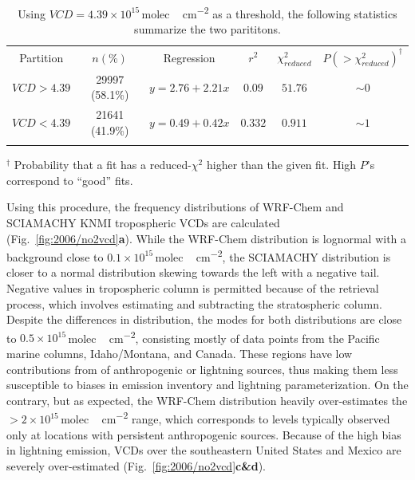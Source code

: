 	\begin{table}
		\begin{center}
		\begin{singlespacing}
		\caption[Linear regression on $NO_2$ VCDs]{Using $VCD=4.39\times10^{15}$\,\unit{molec.\,cm^{-2}} as a threshold, the following statistics summarize the two parititons.}
		\begin{tabular}{cccccc} \tophline
		Partition&  $n(\%)$ & Regression & $r^2$ & $\chi_{reduced}^2$ & $P(>\chi_{reduced}^2)^\dagger$ \\
		\middlehline
		$VCD>4.39$ & 29997 (58.1\%) & $y=2.76+2.21x$ & $0.09$ & $51.76$ & $\sim0$ \\
		$VCD<4.39$ & 21641 (41.9\%)  & $y=0.49+0.42x$ & $0.332$ & $0.911$ & $\sim1$ \\
		\bottomhline
		\end{tabular}
		\label{tab:2006/no2reg}
		\end{singlespacing}
		\end{center}
		{\footnotesize ${}^\dagger$ Probability that a fit has a reduced-$\chi^2$ higher than the given fit. High $P$'s correspond to ``good'' fits.}
	\end{table}

Using this procedure, the frequency distributions of WRF-Chem and SCIAMACHY KNMI  tropospheric VCDs are calculated (Fig.~\ref{fig:2006/no2vcd}{\bf a}). While the WRF-Chem distribution
is lognormal with a background  close to $0.1\times10^{15}$\,\unit{molec.\,cm^{-2}}, the SCIAMACHY distribution is closer to a normal distribution skewing towards the left with a negative tail. Negative values
in tropospheric column is permitted because of the retrieval process, which involves estimating and subtracting the  stratospheric column. Despite the differences in distribution, the modes for
both distributions are close to $0.5\times10^{15}$\,\unit{molec.\,cm^{-2}}, consisting mostly of data points from the Pacific marine columns, Idaho/Montana, and Canada. These regions have low
contributions from  of anthropogenic or lightning sources, thus making them less susceptible to biases in emission inventory and lightning parameterization. On the contrary, but as expected,
the WRF-Chem distribution heavily over-estimates the $>2\times10^{15}$\,\unit{molec.\,cm^{-2}} range, which corresponds to levels typically observed only at locations with persistent anthropogenic
sources. Because of the high bias in lightning emission,  VCDs over the southeastern United States and Mexico are severely over-estimated (Fig.~\ref{fig:2006/no2vcd}{\bf c\&d}).

